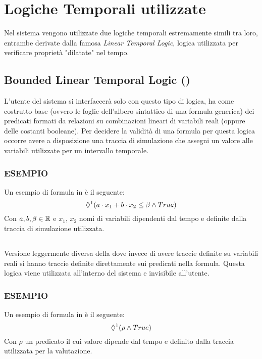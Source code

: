\documentclass[10pt,a4paper]{article}
\begin{document}
	\section{Logiche Temporali utilizzate}
	Nel sistema vengono utilizzate due logiche temporali estremamente simili tra loro, entrambe derivate dalla famosa \emph{Linear Temporal Logic}, logica utilizzata per verificare proprietà "dilatate" nel tempo.
	
	\begin{multicols}{2}
	\subsection*{Bounded Linear Temporal Logic (\BLTL)}
	L'utente del sistema si interfaccerà solo con questo tipo di logica, ha come costrutto base  (ovvero le foglie dell'albero sintattico di una formula generica) dei predicati formati da relazioni su combinazioni lineari di variabili reali (oppure delle costanti booleane). Per decidere la validità di una formula per questa logica occorre avere a disposizione una traccia di simulazione che assegni un valore alle variabili utilizzate per un intervallo temporale.
	
	\subsubsection*{ESEMPIO}
	Un esempio di  formula in \BLTL{} è il seguente:
	$$\Diamond^{1} (a\cdot x_1 + b \cdot x_2 \le \beta \land True)$$
	Con $a,b,\beta \in \mathbb{R}$ e $x_1$, $x_2$ nomi di variabili dipendenti dal tempo e definite dalla traccia di simulazione utilizzata.
	
	\vfill\null\columnbreak
	\subsection*{\BLTLstar}
	 Versione leggermente diversa della \BLTL{} dove invece di avere traccie definite su variabili reali si hanno traccie definite direttamente sui predicati nella formula. Questa logica viene utilizzata all'interno del sistema e invisibile all'utente.
	 
	\subsubsection*{ESEMPIO}
	 Un esempio di  formula in \BLTLstar{} è il seguente:
	 $$\Diamond^{1} (\rho\land True)$$
	 Con $\rho$  un predicato il cui valore dipende dal tempo e definito dalla traccia utilizzata per la valutazione.
	 \end{multicols}
	
\end{document}
